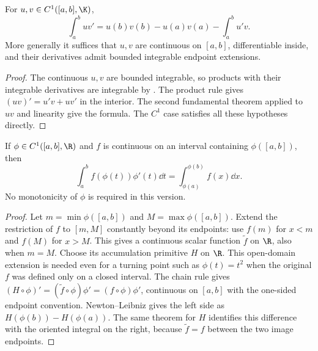 \begin{theorem}
For $u,v\in C^1([a,b],\K)$,
\[\int_a^buv'=u(b)v(b)-u(a)v(a)-\int_a^bu'v.
\]
More generally it suffices that $u,v$ are continuous on $[a,b]$,
differentiable inside, and their derivatives admit bounded integrable
endpoint extensions.
\end{theorem}
\begin{proof}
The continuous $u,v$ are bounded integrable, so products with their
integrable derivatives are integrable by .
The product rule gives $(uv)'=u'v+uv'$ in the interior. The second
fundamental theorem applied to $uv$ and linearity give the formula.
The $C^1$ case satisfies all these hypotheses directly.
\end{proof}

\begin{theorem}
If $\phi\in C^1([a,b],\R)$ and $f$ is continuous on an interval
containing $\phi([a,b])$, then
\[\int_a^bf(\phi(t))\phi'(t)\dd t
=\int_{\phi(a)}^{\phi(b)}f(x)\dd x.
\]
No monotonicity of $\phi$ is required in this version.
\end{theorem}
\begin{proof}
Let $m=\min\phi([a,b])$ and $M=\max\phi([a,b])$. Extend the restriction of $f$ to $[m,M]$ constantly beyond its endpoints: use $f(m)$ for $x<m$ and $f(M)$ for $x>M$. This gives a continuous scalar function $\widetilde f$ on $\R$, also when $m=M$. Choose its accumulation primitive $H$ on $\R$. This open-domain extension is needed even for a turning point such as $\phi(t)=t^2$ when the original $f$ was defined only on a closed interval.
The chain rule gives $(H\circ\phi)'=(\widetilde f\circ\phi)\phi'=(f\circ\phi)\phi'$, continuous
on $[a,b]$ with the one-sided endpoint convention. Newton--Leibniz gives
the left side as $H(\phi(b))-H(\phi(a))$. The same theorem for $H$
identifies this difference with the oriented integral on the right, because $\widetilde f=f$ between the two image endpoints.
\end{proof}


